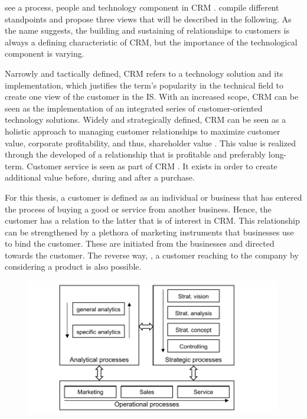 		\citeauthor{Chen_2003} see a process, people and technology component in \acrshort{CRM} \citep{Chen_2003}. \cite{paynefrow2005} compile different standpoints and propose three views that will be described in the following. As the name suggests, the building and sustaining of relationships to customers is always a defining characteristic of \acrshort{CRM}, but the importance of the technological component is varying. 
		
		Narrowly and tactically defined, \acrshort{CRM} refers to a technology solution and its implementation, which justifies the term's popularity in the technical field to create one view of the customer in the \acrshort{IS}. With an increased scope, \acrshort{CRM} can be seen as the implementation of an integrated series of customer-oriented technology solutions. Widely and strategically defined, \acrshort{CRM} can be seen as a holistic approach to managing customer relationships to maximize customer value, corporate profitability, and thus, shareholder value \citep{payne2004role}. This value is realized through the developed of a relationship that is profitable and preferably long-term.  Customer service is seen as part of \acrshort{CRM} \citep[]{Helmke_2012}. It exists in order to create additional value before, during and after a purchase. 
	
		For this thesis, a customer is defined as an individual or business that has entered the process of buying a good or service from another business. Hence, the customer has a relation to the latter that is of interest in CRM. This relationship can be strengthened by a plethora of marketing instruments that businesses use to bind the customer. These are initiated from the businesses and directed towards the customer. The reverse way, \ie, a customer reaching to the company by considering a product is also possible. 
		
			\begin{figure}[caption={CRM Processes}, label={fig:crmprocessfr}]
			{	\includegraphics[width=.8\textwidth]{figures/crmprocessfr.pdf}	
	\\
						 \parbox{0.53\textwidth}{}
			 } 

		\end{figure}
	
